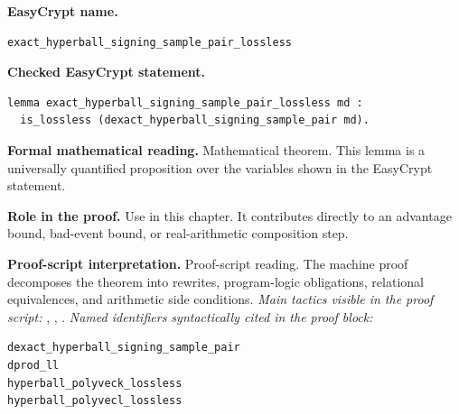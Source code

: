 \begin{formaltheorem}
\noindent\textbf{EasyCrypt name.}
\begin{lstlisting}[language=EasyCrypt,basicstyle=\ttfamily\scriptsize]
exact_hyperball_signing_sample_pair_lossless
\end{lstlisting}
\noindent\textbf{Checked EasyCrypt statement.}
\begin{lstlisting}[language=EasyCrypt,basicstyle=\ttfamily\scriptsize]
lemma exact_hyperball_signing_sample_pair_lossless md :
  is_lossless (dexact_hyperball_signing_sample_pair md).
\end{lstlisting}
\noindent\textbf{Formal mathematical reading.}
Mathematical theorem. This lemma is a universally quantified proposition over the variables shown in the EasyCrypt statement.

\noindent\textbf{Role in the proof.}
Use in this chapter. It contributes directly to an advantage bound, bad-event bound, or real-arithmetic composition step.

\noindent\textbf{Proof-script interpretation.}
Proof-script reading. The machine proof decomposes the theorem into rewrites, program-logic obligations, relational equivalences, and arithmetic side conditions.
\emph{Main tactics visible in the proof script:} , , .
\emph{Named identifiers syntactically cited in the proof block:}
\begin{lstlisting}[language=EasyCrypt,basicstyle=\ttfamily\scriptsize]
dexact_hyperball_signing_sample_pair
dprod_ll
hyperball_polyveck_lossless
hyperball_polyvecl_lossless
\end{lstlisting}

\end{formaltheorem}


